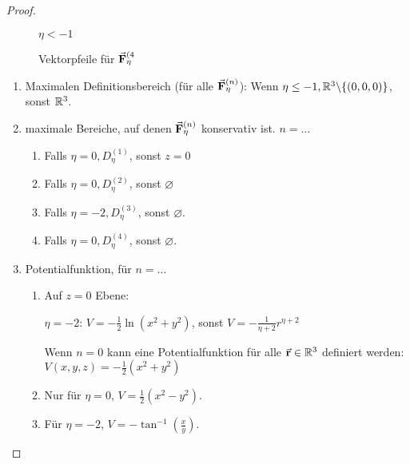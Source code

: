 \begin{proof}
\begin{figure}[h!]
\begin{subcaptionbox}{$\eta<-1$}
		{}
	\end{subcaptionbox}
	\caption{Vektorpfeile f\"{u}r $\va F_\eta^{(4}$}
\end{figure}
\begin{enumerate}
	\item Maximalen Definitionsbereich (f\"{u}r alle $\va F_\eta^{(n)}$): Wenn $\eta\le -1, \mathbb{R}^3\backslash \{(0,0,0)\}$, sonst $\mathbb{R}^3$.
	\item maximale Bereiche, auf denen $\va F_\eta^{(n)}$ konservativ ist. $n=\dots$
	\begin{enumerate}[label=(\arabic*)]
		\item Falls $\eta=0,D_\eta^{(1)}$, sonst $z=0$
		\item Falls $\eta=0, D_\eta^{(2)}$, sonst $\varnothing$
		\item Falls $\eta=-2, D_\eta^{(3)}$, sonst $\varnothing$.
		\item Falls $\eta=0, D_\eta^{(4)}$, sonst $\varnothing$.
	\end{enumerate}
	\item Potentialfunktion, f\"{u}r $n=\dots$
	\begin{enumerate}[label=(\arabic*)]
		\item Auf $z=0$ Ebene:
		
		$\eta=-2$: $V=-\frac 12\ln\left(x^2+y^2\right)$, sonst $V=-\frac 1{\eta+2}r^{\eta+2}$

		Wenn $n=0$ kann eine Potentialfunktion f\"{u}r alle $\va r\in\mathbb{R}^3$ definiert werden: $V(x,y,z)=-\frac{1}{2}\left( x^2+y^2 \right) $

	\item Nur f\"{u}r $\eta=0$, $V=\frac{1}{2}\left( x^2-y^2 \right) $.
	\item F\"{u}r $\eta=-2$, $V=-\tan^{-1}\left( \frac{x}{y} \right) $.


\end{enumerate}
\end{enumerate}
\end{proof}
